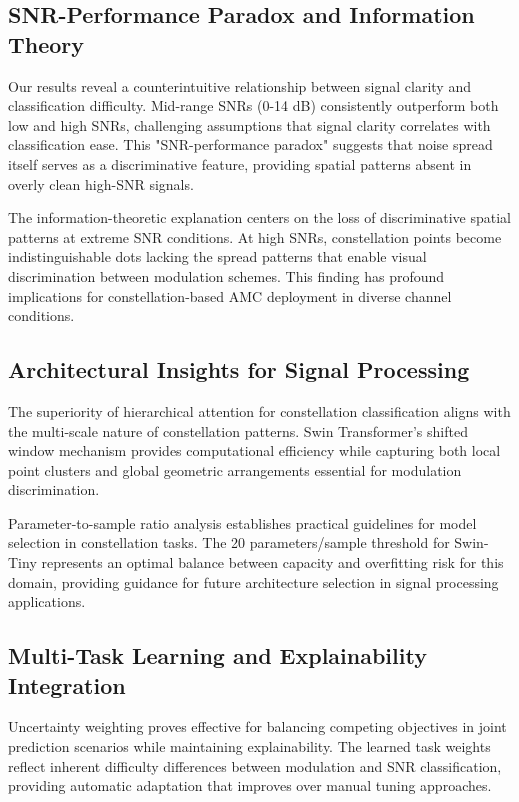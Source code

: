 \documentclass{ELSP}
\begin{document}
{{\subsection{SNR-Performance Paradox and Information Theory}

Our results reveal a counterintuitive relationship between signal clarity and classification difficulty. Mid-range SNRs (0-14 dB) consistently outperform both low and high SNRs, challenging assumptions that signal clarity correlates with classification ease. This "SNR-performance paradox" suggests that noise spread itself serves as a discriminative feature, providing spatial patterns absent in overly clean high-SNR signals.

The information-theoretic explanation centers on the loss of discriminative spatial patterns at extreme SNR conditions. At high SNRs, constellation points become indistinguishable dots lacking the spread patterns that enable visual discrimination between modulation schemes. This finding has profound implications for constellation-based AMC deployment in diverse channel conditions.

\subsection{Architectural Insights for Signal Processing}

The superiority of hierarchical attention for constellation classification aligns with the multi-scale nature of constellation patterns. Swin Transformer's shifted window mechanism provides computational efficiency while capturing both local point clusters and global geometric arrangements essential for modulation discrimination.

Parameter-to-sample ratio analysis establishes practical guidelines for model selection in constellation tasks. The 20 parameters/sample threshold for Swin-Tiny represents an optimal balance between capacity and overfitting risk for this domain, providing guidance for future architecture selection in signal processing applications.

\subsection{Multi-Task Learning and Explainability Integration}

Uncertainty weighting proves effective for balancing competing objectives in joint prediction scenarios while maintaining explainability. The learned task weights reflect inherent difficulty differences between modulation and SNR classification, providing automatic adaptation that improves over manual tuning approaches.

}}
\end{document}
